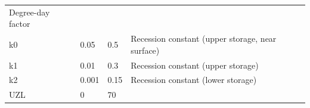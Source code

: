 \documentclass[
]{book}
\begin{document}
\begin{longtable}[]{@{}llll@{}}
\begin{minipage}[t]{0.31\columnwidth}
Degree-day factor\strut
\end{minipage}\tabularnewline
\begin{minipage}[t]{0.29\columnwidth}\raggedright
k0\strut
\end{minipage} & \begin{minipage}[t]{0.16\columnwidth}\raggedright
0.05\strut
\end{minipage} & \begin{minipage}[t]{0.13\columnwidth}\raggedright
0.5\strut
\end{minipage} & \begin{minipage}[t]{0.31\columnwidth}\raggedright
Recession constant (upper storage, near surface)\strut
\end{minipage}\tabularnewline
\begin{minipage}[t]{0.29\columnwidth}\raggedright
k1\strut
\end{minipage} & \begin{minipage}[t]{0.16\columnwidth}\raggedright
0.01\strut
\end{minipage} & \begin{minipage}[t]{0.13\columnwidth}\raggedright
0.3\strut
\end{minipage} & \begin{minipage}[t]{0.31\columnwidth}\raggedright
Recession constant (upper storage)\strut
\end{minipage}\tabularnewline
\begin{minipage}[t]{0.29\columnwidth}\raggedright
k2\strut
\end{minipage} & \begin{minipage}[t]{0.16\columnwidth}\raggedright
0.001\strut
\end{minipage} & \begin{minipage}[t]{0.13\columnwidth}\raggedright
0.15\strut
\end{minipage} & \begin{minipage}[t]{0.31\columnwidth}\raggedright
Recession constant (lower storage)\strut
\end{minipage}\tabularnewline
\begin{minipage}[t]{0.29\columnwidth}\raggedright
UZL\strut
\end{minipage} & \begin{minipage}[t]{0.16\columnwidth}\raggedright
0\strut
\end{minipage} & \begin{minipage}[t]{0.13\columnwidth}\raggedright
70\strut
\end{minipage} & \begin{minipage}[t]{0.31\columnwidth}\raggedright

\end{minipage}
\end{longtable}
\end{document}
